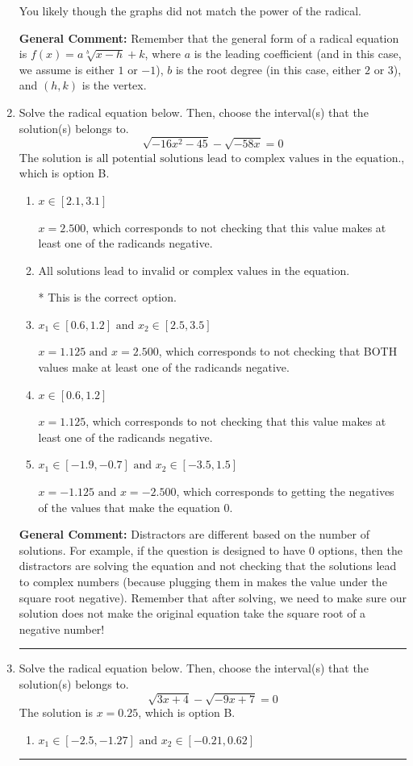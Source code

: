 \documentclass{extbook}[14pt]
\newcommand{\litem}[1]{\item #1

\rule{\textwidth}{0.4pt}}
\begin{document}
\begin{enumerate}
{\begin{enumerate}[label=\Alph*.]
You likely though the graphs did not match the power of the radical.
\end{enumerate}

\textbf{General Comment:} Remember that the general form of a radical equation is $ f(x) = a \sqrt[b]{x - h} + k$, where $a$ is the leading coefficient (and in this case, we assume is either $1$ or $-1$), $b$ is the root degree (in this case, either $2$ or $3$), and $(h, k)$ is the vertex.
}
\litem{
Solve the radical equation below. Then, choose the interval(s) that the solution(s) belongs to.
\[ \sqrt{-16 x^2 - 45} - \sqrt{-58 x} = 0 \]The solution is \( \text{all potential solutions lead to complex values in the equation.} \), which is option B.\begin{enumerate}[label=\Alph*.]
\item \( x \in [2.1,3.1] \)

$x = 2.500$, which corresponds to not checking that this value makes at least one of the radicands negative.
\item \( \text{All solutions lead to invalid or complex values in the equation.} \)

* This is the correct option.
\item \( x_1 \in [0.6, 1.2] \text{ and } x_2 \in [2.5,3.5] \)

$x = 1.125 \text{ and } x = 2.500$, which corresponds to not checking that BOTH values make at least one of the radicands negative.
\item \( x \in [0.6,1.2] \)

$x = 1.125$, which corresponds to not checking that this value makes at least one of the radicands negative.
\item \( x_1 \in [-1.9, -0.7] \text{ and } x_2 \in [-3.5,1.5] \)

$x = -1.125 \text{ and } x = -2.500$, which corresponds to getting the negatives of the values that make the equation 0.
\end{enumerate}

\textbf{General Comment:} Distractors are different based on the number of solutions. For example, if the question is designed to have 0 options, then the distractors are solving the equation and not checking that the solutions lead to complex numbers (because plugging them in makes the value under the square root negative). Remember that after solving, we need to make sure our solution does not make the original equation take the square root of a negative number!
}
\litem{
Solve the radical equation below. Then, choose the interval(s) that the solution(s) belongs to.
\[ \sqrt{3 x + 4} - \sqrt{-9 x + 7} = 0 \]The solution is \( x = 0.25 \), which is option B.\begin{enumerate}[label=\Alph*.]
\item \( x_1 \in [-2.5, -1.27] \text{ and } x_2 \in [-0.21,0.62] \)


\end{enumerate}}
\end{enumerate}
\end{document}
